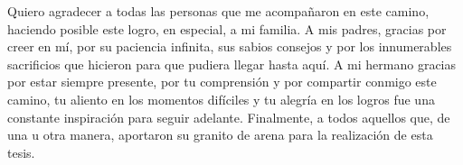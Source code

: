 \begin{acknowledgements}
  Quiero agradecer a todas las personas que me acompañaron en este camino, haciendo posible este logro, en especial, a mi familia. A mis padres, gracias por creer en mí, por su paciencia infinita, sus sabios consejos y por los innumerables sacrificios que hicieron para que pudiera llegar hasta aquí. A mi hermano gracias por estar siempre presente, por tu comprensión y por compartir conmigo este camino, tu aliento en los momentos difíciles y tu alegría en los logros fue una constante inspiración para seguir adelante. Finalmente, a todos aquellos que, de una u otra manera, aportaron su granito de arena para la realización de esta tesis. 
\end{acknowledgements}